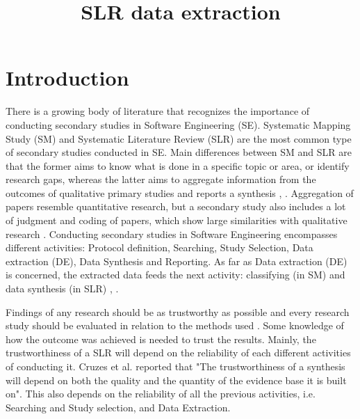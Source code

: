 \documentclass{article}
\title{SLR data extraction}
\author{}
\begin{document}
\maketitle
      

\section{Introduction}

There is a growing body of literature that recognizes the importance of conducting secondary studies in Software Engineering (SE). Systematic Mapping Study (SM) and Systematic Literature Review (SLR) are the most common type of secondary studies conducted in SE. Main differences between SM and SLR are that the former aims to know what is done in a specific topic or area, or identify research gaps, whereas the latter aims to aggregate information from the outcomes of qualitative primary studies and reports a synthesis \cite{Kitchenham2015}, \cite{Wohlin2013}. Aggregation of papers resemble quantitative research, but a secondary study also includes a lot of judgment and coding of papers, which show large similarities with qualitative research \cite{Wohlin2013}.
Conducting secondary studies in Software Engineering encompasses different activities: Protocol definition, Searching, Study Selection, Data extraction (DE), Data Synthesis and Reporting. As far as Data extraction (DE) is concerned, the extracted data feeds the next activity: classifying (in SM) and data synthesis (in SLR) \cite{Kitchenham2015}, \cite{Garousi2017}. 

Findings of any research should be as trustworthy as possible and every research study should be evaluated in relation to the methods used \cite{Cruzes2011}. Some knowledge of how the outcome was achieved is needed to trust the results. Mainly, the trustworthiness of a SLR will depend on the reliability of each different activities of conducting it. Cruzes et al. \cite{Cruzes2011} reported  that "The trustworthiness of a synthesis will depend on both the quality and the quantity of the evidence base it is built on". This also depends on the reliability of all the previous activities, i.e. Searching and Study selection, and Data Extraction.
\end{document}

